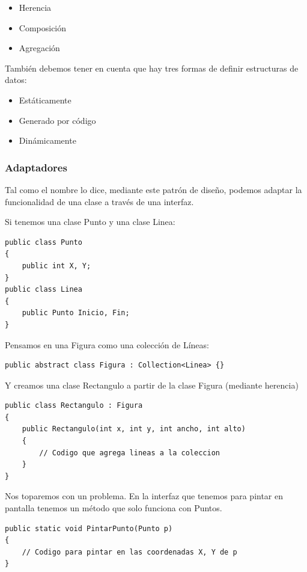 \documentclass[twoside,twocolumn]{article}
\begin{document}
\begin{itemize}
\item Herencia
\item Composición
\item Agregación
\end{itemize}

También debemos tener en cuenta que hay tres formas de definir estructuras de datos:

\begin{itemize}
\item Estáticamente
\item Generado por código
\item Dinámicamente
\end{itemize}

\subsubsection{Adaptadores}

Tal como el nombre lo dice, mediante este patrón de diseño, podemos adaptar la funcionalidad de una clase a través de una interfaz.

Si tenemos una clase Punto y una clase Linea:
\lstset{breaklines=true,style=sharpc}
\begin{lstlisting}
public class Punto
{
    public int X, Y;
}
public class Linea
{
    public Punto Inicio, Fin;
}
\end{lstlisting}

Pensamos en una Figura como una colección de Líneas:
\lstset{breaklines=true,style=sharpc}
\begin{lstlisting}
public abstract class Figura : Collection<Linea> {}
\end{lstlisting}

Y creamos una clase Rectangulo a partir de la clase Figura (mediante herencia)
\lstset{breaklines=true,style=sharpc}
\begin{lstlisting}
public class Rectangulo : Figura
{
    public Rectangulo(int x, int y, int ancho, int alto)
    {
        // Codigo que agrega lineas a la coleccion
    }
}
\end{lstlisting}

Nos toparemos con un problema. En la interfaz que tenemos para pintar en pantalla tenemos un método que solo funciona con Puntos.
\lstset{style=sharpc}
\begin{lstlisting}
public static void PintarPunto(Punto p)
{
    // Codigo para pintar en las coordenadas X, Y de p
}
\end{lstlisting}
\end{document}
